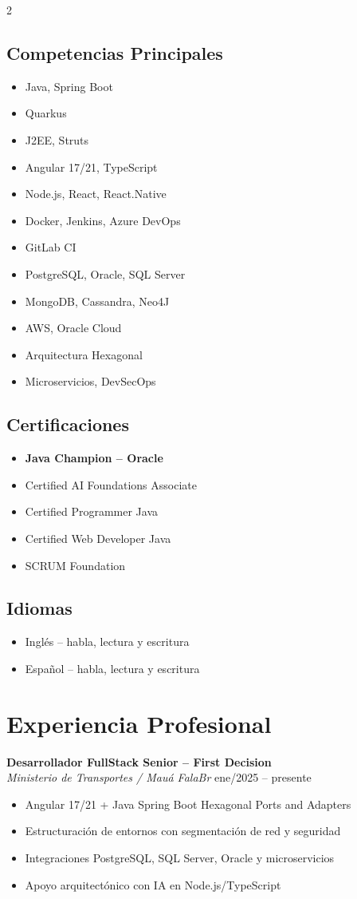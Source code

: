 \documentclass[a4paper,11pt]{article}
\newcommand{\sectionleft}[1]{\subsection*{#1}}
\newcommand{\sectionright}[1]{\section*{#1}}
\begin{document}
\begin{paracol}{2}

\sectionleft{Competencias Principales}
\begin{itemize}
    \item Java, Spring Boot
    \item Quarkus
    \item J2EE, Struts
    \item Angular 17/21, TypeScript
    \item Node.js, React, React.Native
    \item Docker, Jenkins, Azure DevOps
    \item GitLab CI
    \item PostgreSQL, Oracle, SQL Server
    \item MongoDB, Cassandra, Neo4J
    \item AWS, Oracle Cloud
    \item Arquitectura Hexagonal
    \item Microservicios, DevSecOps
\end{itemize}

\vspace{4pt}
\sectionleft{Certificaciones}
\begin{itemize}
    \item \textbf{Java Champion – Oracle}
    \item Certified AI Foundations Associate
    \item Certified Programmer Java
    \item Certified Web Developer Java
    \item SCRUM Foundation
\end{itemize}

\vspace{4pt}
\sectionleft{Idiomas}
\begin{itemize}
    \item Inglés – habla, lectura y escritura
    \item Español – habla, lectura y escritura
\end{itemize}

\switchcolumn

\sectionright{Experiencia Profesional}

\textbf{Desarrollador FullStack Senior – First Decision} \\
\textit{Ministerio de Transportes / Mauá FalaBr}
\hfill ene/2025 – presente
\begin{itemize}
    \item Angular 17/21 + Java Spring Boot Hexagonal Ports and Adapters
    \item Estructuración de entornos con segmentación de red y seguridad
    \item Integraciones PostgreSQL, SQL Server, Oracle y microservicios
    \item Apoyo arquitectónico con IA en Node.js/TypeScript
\end{itemize}


\end{paracol}
\end{document}
